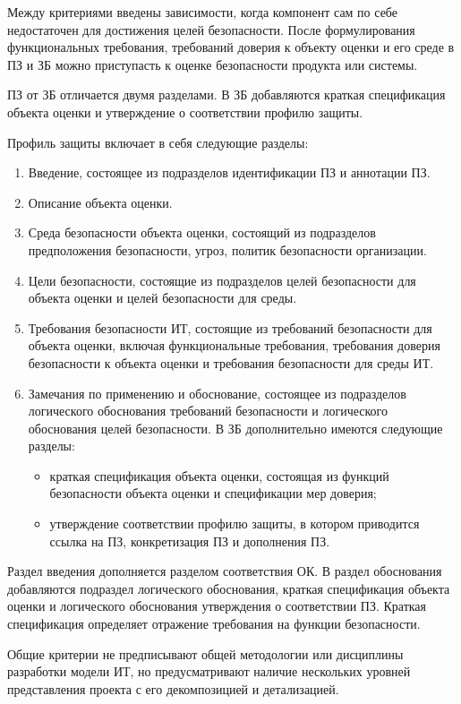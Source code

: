 \documentclass[12pt, russian, oneside, article]{ncc}
\begin{document}
Между критериями введены зависимости, когда компонент сам по себе недостаточен для достижения целей безопасности. После формулирования функциональных требования, требований доверия к объекту оценки и его среде в ПЗ и ЗБ можно приступасть к оценке безопасности продукта или системы.

ПЗ от ЗБ отличается двумя разделами. В ЗБ добавляются краткая спецификация объекта оценки и утверждение о соответствии профилю защиты.

Профиль защиты включает в себя следующие разделы:
\begin{enumerate}
\item Введение, состоящее из подразделов идентификации ПЗ и аннотации ПЗ.
\item Описание объекта оценки.
\item Среда безопасности объекта оценки, состоящий из подразделов предположения безопасности, угроз, политик безопасности организации.
\item Цели безопасности, состоящие из подразделов целей безопасности для объекта оценки и целей безопасности для среды.
\item Требования безопасности ИТ, состоящие из требований безопасности для объекта оценки, включая функциональные требования, требования доверия безопасности к объекта оценки и требования безопасности для среды ИТ.
\item Замечания по применению и обоснование, состоящее из подразделов логического обоснования требований безопасности и логического обоснования целей безопасности. В ЗБ дополнительно имеются следующие разделы:

\begin{itemize}
\item краткая спецификация объекта оценки, состоящая из функций безопасности объекта оценки и спецификации мер доверия;
\item утверждение соответствии профилю защиты, в котором приводится ссылка на ПЗ, конкретизация ПЗ и дополнения ПЗ.
\end{itemize}

\end{enumerate}

Раздел введения дополняется разделом соответствия ОК. В раздел обоснования добавляются подраздел логического обоснования, краткая спецификация объекта оценки и логического обоснования утверждения о соответствии ПЗ. Краткая спецификация определяет отражение требования на функции безопасности.

Общие критерии не предписывают общей методологии или дисциплины разработки модели ИТ, но предусматривают наличие нескольких уровней представления проекта с его декомпозицией и детализацией.
\end{document}

